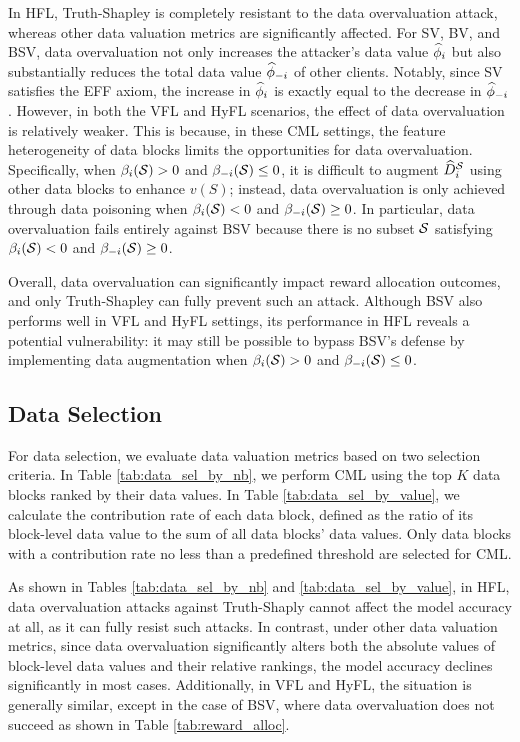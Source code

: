 In HFL, Truth-Shapley is completely resistant to the data overvaluation attack, whereas other data valuation metrics are significantly affected. 
For SV, BV, and BSV, data overvaluation not only increases the attacker's data value $\widehat{\phi}_i$ but also substantially reduces the total data value $\widehat{\phi}_{-i}$ of other clients. 
Notably, since SV satisfies the EFF axiom, the increase in $\widehat{\phi}_i$ is exactly equal to the decrease in $\widehat{\phi}_{-i}$.
However, in both the VFL and HyFL scenarios, the effect of data overvaluation is relatively weaker. 
This is because, in these CML settings, the feature heterogeneity of data blocks limits the opportunities for data overvaluation. 
Specifically, when $\beta_i(\mathcal{S}) > 0$ and $\beta_{-i}(\mathcal{S}) \leq 0$, it is difficult to augment $\widehat{D}^{\mathcal{S}}_{i}$ using other data blocks to enhance $v(S)$; 
instead, data overvaluation is only achieved through data poisoning when $\beta_i(\mathcal{S}) < 0$ and $\beta_{-i}(\mathcal{S}) \geq 0$. 
In particular, data overvaluation fails entirely against BSV because there is no subset $\mathcal{S}$ satisfying $\beta_i(\mathcal{S}) < 0$ and $\beta_{-i}(\mathcal{S}) \geq 0$.

Overall, data overvaluation can significantly impact reward allocation outcomes, and only Truth-Shapley can fully prevent such an attack. 
Although BSV also performs well in VFL and HyFL settings, its performance in HFL reveals a potential vulnerability: it may still be possible to bypass BSV’s defense by implementing data augmentation when $\beta_i(\mathcal{S}) > 0$ and $\beta_{-i}(\mathcal{S}) \leq 0$.


\subsection{Data Selection}
For data selection, we evaluate data valuation metrics based on two selection criteria. 
In Table \ref{tab:data_sel_by_nb}, we perform CML using the top $K$ data blocks ranked by their data values. 
In Table \ref{tab:data_sel_by_value}, we calculate the contribution rate of each data block, defined as the ratio of its block-level data value to the sum of all data blocks' data values. 
Only data blocks with a contribution rate no less than a predefined threshold are selected for CML.

As shown in Tables \ref{tab:data_sel_by_nb} and \ref{tab:data_sel_by_value}, in HFL, data overvaluation attacks against Truth-Shaply cannot affect the model accuracy at all, as it can fully resist such attacks. 
In contrast, under other data valuation metrics, since data overvaluation significantly alters both the absolute values of block-level data values and their relative rankings, the model accuracy declines significantly in most cases.
Additionally, in VFL and HyFL, the situation is generally similar, except in the case of BSV, where data overvaluation does not succeed as shown in Table \ref{tab:reward_alloc}.

